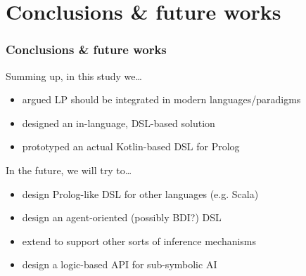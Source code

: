\documentclass[presentation]{beamer}
\begin{document}

\section{Conclusions \& future works}

\begin{frame}%
\frametitle{Conclusions \& future works}

\begin{block}{Summing up, in this study we\ldots}
    \begin{itemize}
        \item argued LP should be integrated in modern languages/paradigms
        \item designed an in-language, DSL-based solution
        \item prototyped an actual Kotlin-based DSL for Prolog
    \end{itemize}
\end{block}

\begin{exampleblock}{In the future, we will try to\ldots}
    \begin{itemize}
        \item design Prolog-like DSL for other languages (e.g. Scala)
        \item design an agent-oriented (possibly BDI?) DSL
        \item extend \twopkt{} to support other sorts of inference mechanisms
        \item design a logic-based API for sub-symbolic AI
    \end{itemize}
\end{exampleblock}

\end{frame}
\end{document}
